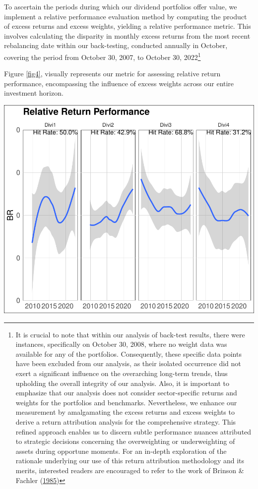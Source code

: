 \documentclass[11pt,preprint, authoryear]{elsarticle}
\let\origfigure\figure
\let\endorigfigure\endfigure
\renewenvironment{figure}[1][2] {
    \expandafter\origfigure\expandafter[H]
} {
    \endorigfigure
}
\numberwithin{equation}{section}
\numberwithin{figure}{section}
\numberwithin{table}{section}
\let\rmarkdownfootnote\footnote%
\def\footnote{\protect\rmarkdownfootnote}
\begin{document}
To ascertain the periods during which our dividend portfolios offer
value, we implement a relative performance evaluation method by
computing the product of excess returns and excess weights, yielding a
relative performance metric. This involves calculating the disparity in
monthly excess returns from the most recent rebalancing date within our
back-testing, conducted annually in October, covering the period from
October 30, 2007, to October 30, 2022\footnote{It is crucial to note
  that within our analysis of back-test results, there were instances,
  specifically on October 30, 2008, where no weight data was available
  for any of the portfolios. Consequently, these specific data points
  have been excluded from our analysis, as their isolated occurrence did
  not exert a significant influence on the overarching long-term trends,
  thus upholding the overall integrity of our analysis. Also, it is
  important to emphasize that our analysis does not consider
  sector-specific returns and weights for the portfolios and benchmarks.
  Nevertheless, we enhance our measurement by amalgamating the excess
  returns and excess weights to derive a return attribution analysis for
  the comprehensive strategy. This refined approach enables us to
  discern subtle performance nuances attributed to strategic decisions
  concerning the overweighting or underweighting of assets during
  opportune moments. For an in-depth exploration of the rationale
  underlying our use of this return attribution methodology and its
  merits, interested readers are encouraged to refer to the work of
  Brinson \& Fachler
  (\protect\hyperlink{ref-brinson1985measuring}{1985})}

Figure \ref{fig4}, visually represents our metric for assessing relative
return performance, encompassing the influence of excess weights across
our entire investment horizon.

\begin{figure}[H]

\includegraphics{Much_Ado_About_Dividends_files/figure-latex/unnamed-chunk-5-1} \hfill{}

\caption{Rolling 3 Year Returns \label{fig4}}\label{fig:unnamed-chunk-5}
\end{figure}
\end{document}
